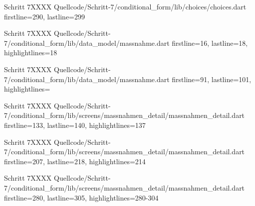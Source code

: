   \begin{alexlisting}{Schritt 7}{XXXX}
    {Quellcode/Schritt-7/conditional_form/lib/choices/choices.dart}
    {firstline=290, lastline=299}
    \label{lst:Schritt5XXXX}
  \end{alexlisting}


  \begin{alexlisting}{Schritt 7}{XXXX}
    {Quellcode/Schritt-7/conditional_form/lib/data_model/massnahme.dart}
    {firstline=16, lastline=18, highlightlines={18}}
    \label{lst:Schritt5XXXX}
  \end{alexlisting}

  \begin{alexlisting}{Schritt 7}{XXXX}
    {Quellcode/Schritt-7/conditional_form/lib/data_model/massnahme.dart}
    {firstline=91, lastline=101, highlightlines={}}
    \label{lst:Schritt5XXXX}
  \end{alexlisting}

  \begin{alexlisting}{Schritt 7}{XXXX}
    {Quellcode/Schritt-7/conditional_form/lib/screens/massnahmen_detail/massnahmen_detail.dart}
    {firstline=133, lastline=140, highlightlines={137}}
    \label{lst:Schritt6XXXXX}
  \end{alexlisting}

  \begin{alexlisting}{Schritt 7}{XXXX}
    {Quellcode/Schritt-7/conditional_form/lib/screens/massnahmen_detail/massnahmen_detail.dart}
    {firstline=207, lastline=218, highlightlines={214}}
    \label{lst:Schritt6XXXXX}
  \end{alexlisting}

  \begin{alexlisting}{Schritt 7}{XXXX}
    {Quellcode/Schritt-7/conditional_form/lib/screens/massnahmen_detail/massnahmen_detail.dart}
    {firstline=280, lastline=305, highlightlines={280-304}}
    \label{lst:Schritt6XXXXX}
  \end{alexlisting}



